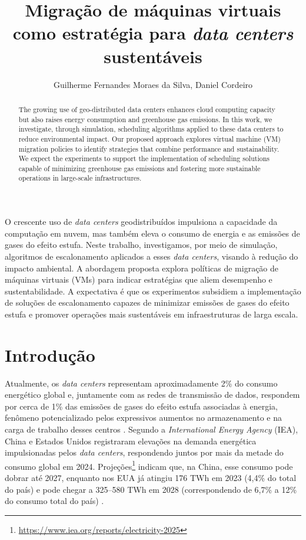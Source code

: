 \documentclass[12pt]{article}
\title{Migração de máquinas virtuais como estratégia para \textit{data centers} sustentáveis}
\author{Guilherme Fernandes Moraes da Silva\inst{1}, Daniel Cordeiro\inst{1}}
\begin{document}
 

\maketitle

\begin{abstract}
The growing use of geo-distributed data centers enhances cloud computing capacity but also raises energy consumption and greenhouse gas emissions. In this work, we investigate, through simulation, scheduling algorithms applied to these data centers to reduce environmental impact. Our proposed approach explores virtual machine (VM) migration policies to identify strategies that combine performance and sustainability. We expect the experiments to support the implementation of scheduling solutions capable of minimizing greenhouse gas emissions and fostering more sustainable operations in large-scale infrastructures.
\end{abstract}
     
\begin{resumo}
O crescente uso de \textit{data centers} geodistribuídos impulsiona a capacidade da computação em nuvem, mas também eleva o consumo de energia e as emissões de gases do efeito estufa. Neste trabalho, investigamos, por meio de simulação, algoritmos de escalonamento aplicados a esses \textit{data centers}, visando à redução do impacto ambiental. A abordagem proposta explora políticas de migração de máquinas virtuais (VMs) para indicar estratégias que aliem desempenho e sustentabilidade. A expectativa é que os experimentos subsidiem a implementação de soluções de escalonamento capazes de minimizar emissões de gases do efeito estufa e promover operações mais sustentáveis em infraestruturas de larga escala.
\end{resumo}


\section{Introdução}
Atualmente, os \textit{data centers} representam aproximadamente 2\% do consumo energético global e, juntamente com as redes de transmissão de dados, respondem por cerca de 1\% das emissões de gases do efeito estufa associadas à energia, fenômeno potencializado pelos expressivos aumentos no armazenamento e na carga de trabalho desses centros \cite{masanet:20}. Segundo a \textit{International Energy Agency} (IEA), China e Estados Unidos registraram elevações na demanda energética impulsionadas pelos \textit{data centers}, respondendo juntos por mais da metade do consumo global em 2024. Projeções\footnote{\url{https://www.iea.org/reports/electricity-2025}} indicam que, na China, esse consumo pode dobrar até 2027, enquanto nos EUA já atingiu 176 TWh em 2023 (4,4\% do total do país) e pode chegar a 325–580 TWh em 2028 (correspondendo de 6,7\% a 12\% do consumo total do país) \cite{shehabi:24}.
\end{document}
